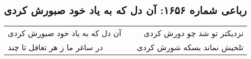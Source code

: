 \begin{center}
\section*{رباعی شماره ۱۶۵۶: آن دل که به یاد خود صبورش کردی}
\label{sec:1656}
\begin{longtable}{l p{0.5cm} r}
آن دل که به یاد خود صبورش کردی
&&
نزدیکتر تو شد چو دورش کردی
\\
در ساغر ما ز هر تغافل تا چند
&&
تلخیش نماند بسکه شورش کردی
\\
\end{longtable}
\end{center}
